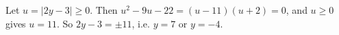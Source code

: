 Let $u=|2y-3|\ge0$. Then $u^2-9u-22=(u-11)(u+2)=0$, and $u\ge0$ gives $u=11$. So $2y-3=\pm11$, i.e. $\boxed{y=7\text{ or }y=-4}$.
